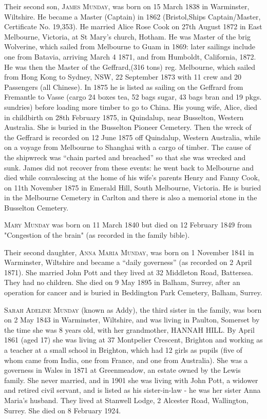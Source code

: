 Their second son, \textsc{James Munday}, was born on 15 March 1838 in Warminster, Wiltshire.  He became a Master (Captain) in 1862 (Bristol,Ships Captain/Master, Certificate No. 19,353).  He married Alice Rose Cook on 27th August 1872 in East Melbourne, Victoria, at St Mary's church, Hotham. He was Master of the brig Wolverine, which sailed from Melbourne to Guam in 1869: later sailings include one from Batavia, arriving March 4 1871, and from Humboldt, California, 1872. He was then the Master of the Geffrard,(316 tons) reg. Melbourne, which sailed from Hong Kong to Sydney, NSW, 22 September 1873 with 11 crew and 20 Passengers (all Chinese). In 1875 he is listed as sailing on the Geffrard from Fremantle to Vasse (cargo 24 boxes tea, 52 bags sugar, 43 bags bran and 19 pkgs. sundries) before loading more timber to go to China. His young wife, Alice, died in childbirth on 28th February 1875, in Quindalup, near Busselton, Western Australia. She is buried in the Busselton Pioneer Cemetery.  Then the wreck of the Geffrard is recorded on 12 June 1875 off Quindalup, Western Australia, while on a voyage from Melbourne to Shanghai with a cargo of timber. The cause of the shipwreck was ``chain parted and breached'' so that she was wrecked and sunk. James did not recover from these events: he went back to Melbourne and died while convalescing at the home of his wife's parents Henry and Fanny Cook, on 11th November 1875 in Emerald Hill, South Melbourne, Victoria. He is buried in the Melbourne Cemetery in Carlton and there is also a memorial stone in the Busselton Cemetery.  

\textsc{Mary Munday} was born on 11 March 1840 but died on 12 February 1849 from	"Congestion of the brain" (as recorded in the family bible). 

Their second daughter, \textsc{Anna Maria Munday}, was born on 1 November 1841 in Warminster, Wiltshire and became a ``daily governess'' (as recorded on 2 April 1871). She married John Pott and they lived at 32 Middleton Road, Battersea. They had no children.  She died on	9 May 1895 in Balham, Surrey, after an operation for cancer and is buried in Beddington Park Cemetery, Balham, Surrey.  

\textsc{Sarah Adeline Munday} (known as Addy), the third sister in the family, was  born on 2 May 1843 in Warminster, Wiltshire, and was living in Paulton, Somerset by the time she was 8 years old, with her grandmother, \uppercase{Hannah Hill}. By April 1861 (aged 17) she was living at 37 Montpelier Crescent, Brighton and working as a teacher at a small school in Brighton, which had 12 girls as pupils (five of whom came from India, one from France, and one from Australia). She was a governess in Wales in 1871 at Greenmeadow, an estate owned by the Lewis family. She never married, and in 1901 she was living with John Pott, a widower and retired civil servant, and is listed as his sister-in-law - he was her sister Anna Maria's husband. They lived at Stanwell Lodge, 2 Alcester Road, Wallington, Surrey. She died on 8 February 1924. 

